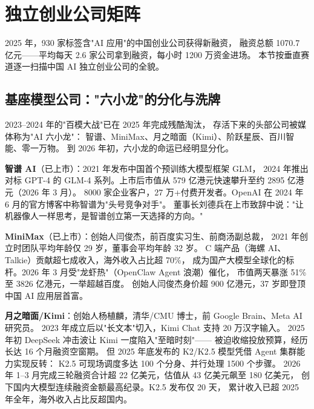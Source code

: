 
\section{独立创业公司矩阵}
\label{sec:china-independents}

2025 年，930 家标签含"AI 应用"的中国创业公司获得新融资，
融资总额 1070.7 亿元——平均每天 2.6 家公司拿到融资，每小时 1200 万资金进场。
本节按垂直赛道逐一扫描中国 AI 独立创业公司的全貌。

\subsection{基座模型公司："六小龙"的分化与洗牌}
\label{subsec:china-foundation-models}

2023--2024 年的"百模大战"已在 2025 年完成残酷淘汰，
存活下来的头部公司被媒体称为"AI 六小龙"：
智谱、MiniMax、月之暗面（Kimi）、阶跃星辰、百川智能、零一万物。
到 2026 年初，六小龙的命运已经明显分化。

\textbf{智谱 AI}（已上市）：2021 年发布中国首个预训练大模型框架 GLM，
2024 年推出对标 GPT-4 的 GLM-4 系列。上市后市值从 579 亿港元快速攀升至约 2895 亿港元（2026 年 3 月）。
8000 家企业客户，27 万+付费开发者。OpenAI 在 2024 年 6 月的官方博客中称智谱为"头号竞争对手"。
董事长刘德兵在上市致辞中说："让机器像人一样思考，是智谱创立第一天选择的方向。"

\textbf{MiniMax}（已上市）：创始人闫俊杰，前百度实习生、前商汤副总裁，
2021 年创立时团队平均年龄仅 29 岁，董事会平均年龄 32 岁。
C 端产品（海螺 AI、Talkie）贡献超七成收入，海外收入占比超 70\%，
成为国产大模型全球化的标杆。2026 年 3 月受"龙虾热"（OpenClaw Agent 浪潮）催化，
市值两天暴涨 51\% 至 3826 亿港元，一举超越百度。
创始人闫俊杰身价超 900 亿港元，37 岁即登顶中国 AI 应用层首富。

\textbf{月之暗面/Kimi}：创始人杨植麟，清华/CMU 博士，前 Google Brain、Meta AI 研究员。
2023 年成立后以"长文本"切入，Kimi Chat 支持 20 万汉字输入。
2025 年初 DeepSeek 冲击波让 Kimi 一度陷入"至暗时刻"——
被迫收缩投放预算，经历长达 16 个月融资空窗期。
但 2025 年底发布的 K2/K2.5 模型凭借 Agent 集群能力实现反转：
K2.5 可现场调度多达 100 个分身、并行处理 1500 个步骤。
2026 年 1--3 月完成三轮融资合计超 22 亿美元，估值从 43 亿美元飙至 180 亿美元，
创下国内大模型连续融资金额最高纪录。K2.5 发布仅 20 天，
累计收入已超 2025 年全年，海外收入占比反超国内。

